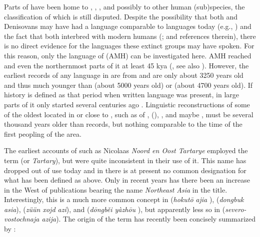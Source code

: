 Parts of  have been home to \textit{}, , , and possibly to other human (sub)species, the classification of which is still disputed. Despite the possibility that both  and Denisovans may have had a language comparable to languages today (e.g., \citealt{DediuLevinson2013}) and the fact that both interbred with modern humans (\citealt{SankararamanPattersonReich2016}; \citealt{Reich2018} and references therein), there is no direct evidence for the languages these extinct groups may have spoken. For this reason, only the language of  (AMH) can be investigated here. AMH reached  and even the northernmost parts of it at least 45 kya (\citealt{Pitulko2016}, see also \citealt{Lbova2014}). However, the earliest records of any language in  are from  and are only about 3250 years old and thus much younger than  (about 5000 years old) or  (about 4700 years old). If history is defined as that period when written language was present, in large parts of  it only started several centuries ago \citep{Bellwood2013}. Linguistic reconstructions of some of the oldest  located in or close to , such as of ,  (), , and maybe , must be several thousand years older than  records, but nothing comparable to the time of the first peopling of the area.

The earliest accounts of  such as Nicolaas  \textit{Noord en Oost Tartarye} employed the term \textit{} (or \textit{Tartary}), but were quite inconsistent in their use of it. This name has dropped out of use today and in  there is at present no common designation for what has been defined as  above. Only in recent years has there been an increase in the West of publications bearing the name \textit{Northeast Asia} in the title. Interestingly, this is a much more common concept in  (\textit{hokut\=o} \textit{ajia} ),  (\textit{dongbuk asia}),  (\textit{züün xojd azi}), and  (\textit{d\=o}\textit{ngběi yàzh\=o}\textit{u} ), but apparently less so in  (\textit{severo-vostochnaja azija}). The origin of the term has recently been concisely summarized by \citet[2]{NarangoaCribbs2014}:

